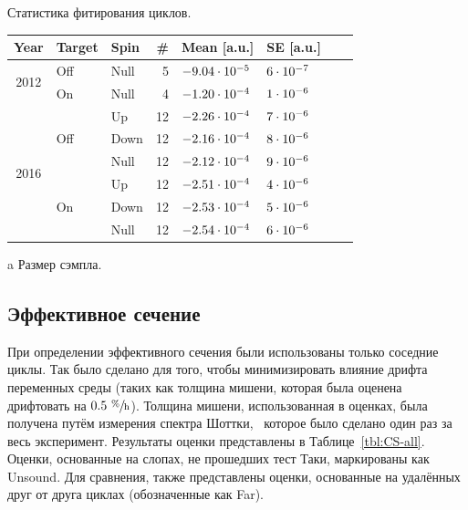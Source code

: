 \documentclass{article}
\begin{document}
	\begin{center}
			\begin{threeparttable}[h]
			\centering
			\caption{Статистика фитирования циклов. \label{tbl:Slp-big}}
			\begin{tabular}{c|llrllrr}
				\hline\hline
				Year          & Target               & Spin & \#\tnote{a} & Mean [a.u.]      & SE [a.u.]    &  \\ \hline
				\multirow{2}{*}{2012} & Off                  & Null & 5           & $-9.04\cdot10^{-5}$ & $6\cdot10^{-7}$ &  \\
				& On                   & Null & 4           & $-1.20\cdot10^{-4}$ & $1\cdot10^{-6}$ &  \\ \hline
				\multirow{6}{*}{2016} & \multirow{3}{*}{Off} & Up   & 12          & $-2.26\cdot10^{-4}$ & $7\cdot10^{-6}$ &  \\
				&                      & Down & 12          & $-2.16\cdot10^{-4}$ & $8\cdot10^{-6}$ &  \\
				&                      & Null & 12          & $-2.12\cdot10^{-4}$ & $9\cdot10^{-6}$ &  \\
				& \multirow{3}{*}{On}  & Up   & 12          & $-2.51\cdot10^{-4}$ & $4\cdot10^{-6}$ &  \\
				&                      & Down & 12          & $-2.53\cdot10^{-4}$ & $5\cdot10^{-6}$ &  \\
				&                      & Null & 12          & $-2.54\cdot10^{-4}$ & $6\cdot10^{-6}$ &  \\ \hline\hline
			\end{tabular}
			\begin{tablenotes}
				\item[a]{Размер сэмпла.}
			\end{tablenotes}
		\end{threeparttable}
	\end{center}
	
	\subsection{Эффективное сечение}
	
	При определении эффективного сечения были использованы только соседние циклы. Так было сделано для того, чтобы минимизировать влияние дрифта переменных среды (таких как толщина мишени, которая была оценена дрифтовать на $0.5~ \sfrac{\%}{\mathrm{h}}$). Толщина мишени, использованная в оценках, была получена путём измерения спектра Шоттки,~\cite{Stein} которое было сделано один раз за весь эксперимент. Результаты оценки представлены в Таблице~\ref{tbl:CS-all}. Оценки, основанные на слопах, не прошедших тест Таки, маркированы как Unsound. Для сравнения, также представлены оценки, основанные на удалённых друг от друга циклах (обозначенные как Far).
	
\end{document}
